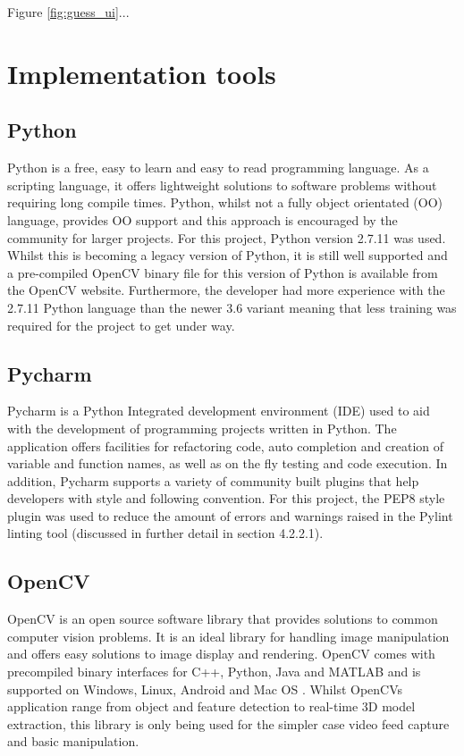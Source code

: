 Figure \ref{fig:guess_ui}...

\section{Implementation tools}
\subsection{Python}
Python is a free, easy to learn and easy to read programming language. As a scripting language, it offers lightweight solutions to software problems without requiring long compile times. Python, whilst not a fully object orientated (OO) language, provides OO support and this approach is encouraged by the community for larger projects. For this project, Python version 2.7.11 was used. Whilst this is becoming a legacy version of Python, it is still well supported and a pre-compiled OpenCV binary file for this version of Python is available from the OpenCV website. Furthermore, the developer had more experience with the 2.7.11 Python language than the newer 3.6 variant meaning that less training was required for the project to get under way.

\subsection{Pycharm}
Pycharm is a Python Integrated development environment (IDE) used to aid with the development of programming projects written in Python. The application offers facilities for refactoring code, auto completion and creation of variable and function names, as well as on the fly testing and code execution. In addition, Pycharm supports a variety of community built plugins that help developers with style and following convention. For this project, the PEP8 style plugin was used to reduce the amount of errors and warnings raised in the Pylint linting tool (discussed in further detail in section 4.2.2.1).

\subsection{OpenCV}
OpenCV is an open source software library that provides solutions to common computer vision problems. It is an ideal library for handling image manipulation and offers easy solutions to image display and rendering. OpenCV comes with precompiled binary interfaces for C++, Python, Java and MATLAB and is supported on Windows, Linux, Android and Mac OS \cite{open_cv_binaries}. Whilst OpenCVs application range from object and feature detection to real-time 3D model extraction, this library is only being used for the simpler case video feed capture and basic manipulation.

